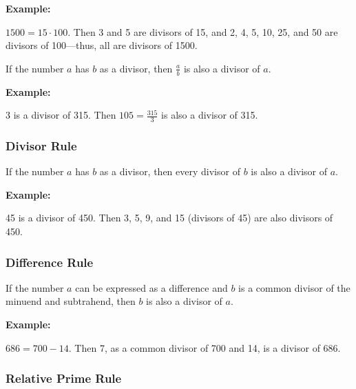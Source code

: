 \textbf{Example:}
\vspace{\baselineskip}
 

\( 1500 = 15 \cdot 100 \). Then 3 and 5 are divisors of 15, and 2, 4, 5, 10, 25, and 50 are divisors of 100—thus, all are divisors of 1500.


If the number \( a \) has \( b \) as a divisor, then \( \frac{a}{b} \) is also a divisor of \( a \). \\
\vspace{\baselineskip}

\textbf{Example:}
\vspace{\baselineskip}
 

3 is a divisor of 315. Then \( 105 = \frac{315}{3} \) is also a divisor of 315.

\subsubsection{Divisor Rule}

If the number \( a \) has \( b \) as a divisor, then every divisor of \( b \) is also a divisor of \( a \). \\
\vspace{\baselineskip}

\textbf{Example:}
\vspace{\baselineskip}
 

45 is a divisor of 450. Then 3, 5, 9, and 15 (divisors of 45) are also divisors of 450.

\subsubsection{Difference Rule}

If the number \( a \) can be expressed as a difference and \( b \) is a common divisor of the minuend and subtrahend, then \( b \) is also a divisor of \( a \). \\
\vspace{\baselineskip}

\textbf{Example:}
\vspace{\baselineskip}
 

\( 686 = 700 - 14 \). Then 7, as a common divisor of 700 and 14, is a divisor of 686.

\subsubsection{Relative Prime Rule}

